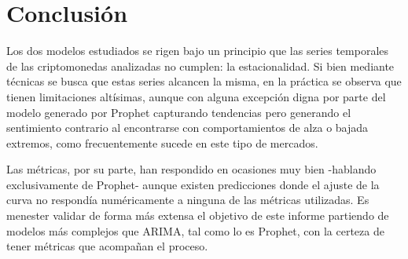 \documentclass[a4paper,10pt]{article}
\begin{document}
\section{Conclusión}

Los dos modelos estudiados se rigen bajo un principio que las series temporales de las criptomonedas analizadas no cumplen: la estacionalidad. Si bien mediante técnicas se busca que estas series alcancen la misma, en la práctica se observa que tienen limitaciones altísimas, aunque con alguna excepción digna por parte del modelo generado por Prophet capturando tendencias pero generando el sentimiento contrario al encontrarse con comportamientos de alza o bajada extremos, como frecuentemente sucede en este tipo de mercados.

Las métricas, por su parte, han respondido en ocasiones muy bien -hablando exclusivamente de Prophet- aunque existen predicciones donde el ajuste de la curva no respondía numéricamente a ninguna de las métricas utilizadas. Es menester validar de forma más extensa el objetivo de este informe partiendo de modelos más complejos que ARIMA, tal como lo es Prophet, con la certeza de tener métricas que acompañan el proceso.
\end{document}
